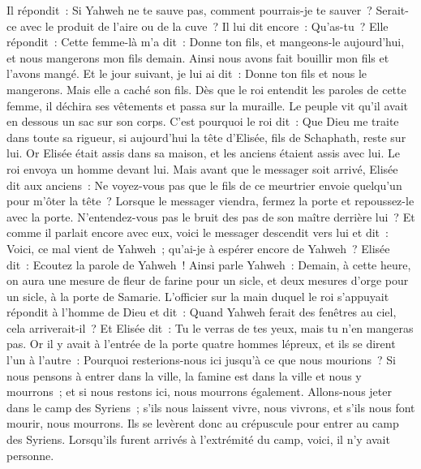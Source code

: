 \begin{multicols}{2}
Il répondit~: Si Yahweh ne te sauve pas, comment pourrais-je te sauver~? Serait-ce avec le produit de l'aire ou de la cuve~?
Il lui dit encore~: Qu'as-tu~? Elle répondit~: Cette femme-là m'a dit~: Donne ton fils, et mangeons-le aujourd'hui, et nous mangerons mon fils demain.
Ainsi nous avons fait bouillir mon fils et l'avons mangé. Et le jour suivant, je lui ai dit~: Donne ton fils et nous le mangerons. Mais elle a caché son fils.
Dès que le roi entendit les paroles de cette femme, il déchira ses vêtements et passa sur la muraille. Le peuple vit qu'il avait en dessous un sac sur son corps.
C'est pourquoi le roi dit~: Que Dieu me traite dans toute sa rigueur, si aujourd'hui la tête d'Elisée, fils de Schaphath, reste sur lui.
Or Elisée était assis dans sa maison, et les anciens étaient assis avec lui. Le roi envoya un homme devant lui. Mais avant que le messager soit arrivé, Elisée dit aux anciens~: Ne voyez-vous pas que le fils de ce meurtrier envoie quelqu'un pour m'ôter la tête~? Lorsque le messager viendra, fermez la porte et repoussez-le avec la porte. N'entendez-vous pas le bruit des pas de son maître derrière lui~?
Et comme il parlait encore avec eux, voici le messager descendit vers lui et dit~: Voici, ce mal vient de Yahweh~; qu'ai-je à espérer encore de Yahweh~?
\VerseOne{}Elisée dit~: Ecoutez la parole de Yahweh~! Ainsi parle Yahweh~: Demain, à cette heure, on aura une mesure de fleur de farine pour un sicle, et deux mesures d'orge pour un sicle, à la porte de Samarie.
L'officier sur la main duquel le roi s'appuyait répondit à l'homme de Dieu et dit~: Quand Yahweh ferait des fenêtres au ciel, cela arriverait-il~? Et Elisée dit~: Tu le verras de tes yeux, mais tu n'en mangeras pas.
Or il y avait à l'entrée de la porte quatre hommes lépreux, et ils se dirent l'un à l'autre~: Pourquoi resterions-nous ici jusqu'à ce que nous mourions~?
Si nous pensons à entrer dans la ville, la famine est dans la ville et nous y mourrons~; et si nous restons ici, nous mourrons également. Allons-nous jeter dans le camp des Syriens~; s'ils nous laissent vivre, nous vivrons, et s'ils nous font mourir, nous mourrons.
Ils se levèrent donc au crépuscule pour entrer au camp des Syriens. Lorsqu'ils furent arrivés à l'extrémité du camp, voici, il n'y avait personne.

\end{multicols}

